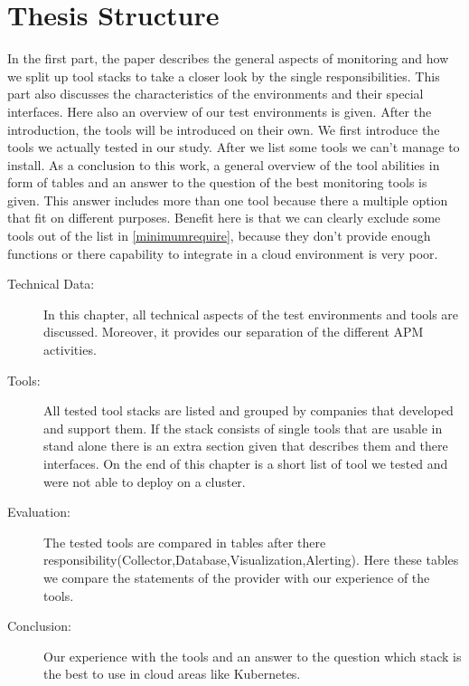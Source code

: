 \section{Thesis Structure}
In the first part, the paper describes the general aspects of monitoring and how we split up tool stacks to take a closer look by the single responsibilities. This part also discusses the characteristics of the environments and their special interfaces. Here also an overview of our test environments is given. After the introduction, the tools will be introduced on their own. We first introduce the tools we actually tested in our study. After we list some tools we can't manage to install. As a conclusion to this work, a general overview  of the tool abilities in form of tables and an answer to the question of the best monitoring tools is given. This answer includes more than one tool because there a multiple option that fit on different purposes. Benefit here is that we can clearly exclude some tools out of the list in \cref{minimumrequire}, because they don't provide enough functions or there capability to integrate in a cloud environment is very poor.
\begin{description}
\item[Technical Data:] In this chapter, all technical aspects of the test environments and tools are discussed. Moreover, it provides our separation of the different APM activities. 
\item[Tools:] All tested tool stacks are listed and grouped by companies that developed and support them. If the stack consists of single tools that are usable in stand alone there is an extra section given that describes them and there interfaces. On the end of this chapter is a short list of tool we tested and were not able to deploy on a cluster.
\item[Evaluation:]The tested tools are compared in tables after there responsibility(Collector,Database,Visualization,Alerting). Here these tables we compare the statements of the provider with our experience of the tools.
\item[Conclusion:] Our experience with the tools and an answer to the question which stack is the best to use in cloud areas like Kubernetes.

\end{description}

